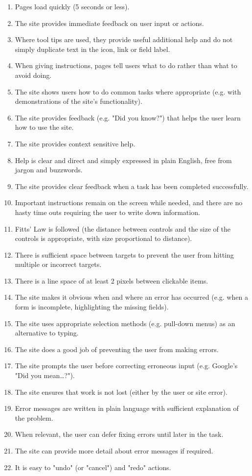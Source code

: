 \begin{itemize}
\begin{enumerate}
        \item Pages load quickly (5 seconds or less).
        \item The site provides immediate feedback on user input or actions.
        \item Where tool tips are used, they provide useful additional help and do not simply duplicate text in the icon, link or field label.
        \item When giving instructions, pages tell users what to do rather than what to avoid doing.
        \item The site shows users how to do common tasks where appropriate (e.g. with demonstrations of the site's functionality).
        \item The site provides feedback (e.g. "Did you know?") that helps the user learn how to use the site.
        \item The site provides context sensitive help.
        \item Help is clear and direct and simply expressed in plain English, free from jargon and buzzwords.
        \item The site provides clear feedback when a task has been completed successfully.
        \item Important instructions remain on the screen while needed, and there are no hasty time outs requiring the user to write down information.
        \item Fitts' Law is followed (the distance between controls and the size of the controls is appropriate, with size proportional to distance).
        \item There is sufficient space between targets to prevent the user from hitting multiple or incorrect targets.
        \item There is a line space of at least 2 pixels between clickable items.
        \item The site makes it obvious when and where an error has occurred (e.g. when a form is incomplete, highlighting the missing fields).
        \item The site uses appropriate selection methods (e.g. pull-down menus) as an alternative to typing.
        \item The site does a good job of preventing the user from making errors.
        \item The site prompts the user before correcting erroneous input (e.g. Google's "Did you mean…?").
        \item The site ensures that work is not lost (either by the user or site error).
        \item Error messages are written in plain language with sufficient explanation of the problem.
        \item When relevant, the user can defer fixing errors until later in the task.
        \item The site can provide more detail about error messages if required.
        \item It is easy to "undo" (or "cancel") and "redo" actions.        
      \end{enumerate}
\end{itemize}


